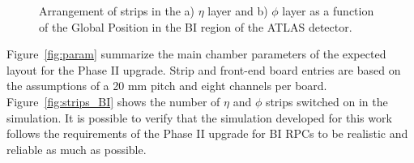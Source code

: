 \begin{figure}[!h]
	\centering	
	\caption{Arrangement of strips in the a) $\eta$ layer and b) $\phi$ layer as a function of the Global Position in the BI region of the ATLAS detector.}
	\label{fig:Nstrips}
\end{figure}	
\newpage
\noindent Figure~\ref{fig:param} summarize the main  chamber parameters of the expected layout 
for the Phase II upgrade. Strip and front-end board 
entries are based on the assumptions of a 20 mm pitch and eight channels per board.\\
Figure~\ref{fig:strips_BI} shows the number of $\eta$ and $\phi$ strips switched on in the 
simulation. It is possible to verify that the simulation developed for this work follows the requirements of the Phase II upgrade for BI RPCs to be realistic and reliable as much as possible.
